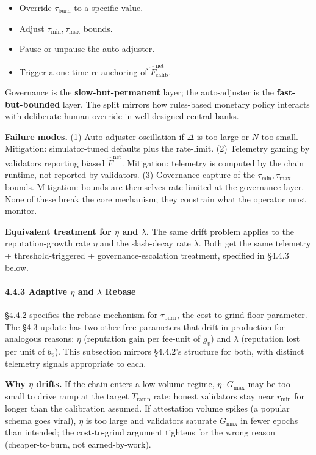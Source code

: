 \documentclass[
  11pt,
]{article}
\providecommand{\tightlist}{%
  \setlength{\itemsep}{0pt}\setlength{\parskip}{0pt}}
\begin{document}
\begin{itemize}
\tightlist
\item
  Override \(\tau_{\text{burn}}\) to a specific value.
\item
  Adjust \(\tau_{\min}, \tau_{\max}\) bounds.
\item
  Pause or unpause the auto-adjuster.
\item
  Trigger a one-time re-anchoring of
  \(\hat{F}^{\text{net}}_{\text{calib}}\).
\end{itemize}

Governance is the \textbf{slow-but-permanent} layer; the auto-adjuster
is the \textbf{fast-but-bounded} layer. The split mirrors how
rules-based monetary policy interacts with deliberate human override in
well-designed central banks.

\textbf{Failure modes.} (1) Auto-adjuster oscillation if \(\Delta\) is
too large or \(N\) too small. Mitigation: simulator-tuned defaults plus
the rate-limit. (2) Telemetry gaming by validators reporting biased
\(\hat{F}^{\text{net}}\). Mitigation: telemetry is computed by the chain
runtime, not reported by validators. (3) Governance capture of the
\(\tau_{\min}, \tau_{\max}\) bounds. Mitigation: bounds are themselves
rate-limited at the governance layer. None of these break the core
mechanism; they constrain what the operator must monitor.

\textbf{Equivalent treatment for $\eta$ and $\lambda$.} The same drift
problem applies to the reputation-growth rate \(\eta\) and the
slash-decay rate \(\lambda\). Both get the same telemetry +
threshold-triggered + governance-escalation treatment, specified in
§4.4.3 below.

\paragraph{\texorpdfstring{4.4.3 Adaptive \(\eta\) and \(\lambda\)
Rebase}{4.4.3 Adaptive \textbackslash eta and \textbackslash lambda Rebase}}\label{adaptive-eta-and-lambda-rebase}

§4.4.2 specifies the rebase mechanism for \(\tau_{\text{burn}}\), the
cost-to-grind floor parameter. The §4.3 update has two other free
parameters that drift in production for analogous reasons: \(\eta\)
(reputation gain per fee-unit of \(g_v\)) and \(\lambda\) (reputation
lost per unit of \(b_v\)). This subsection mirrors §4.4.2's structure
for both, with distinct telemetry signals appropriate to each.

\textbf{Why $\eta$ drifts.} If the chain enters a low-volume regime,
\(\eta \cdot G_{\max}\) may be too small to drive ramp at the target
\(T_{\text{ramp}}\) rate; honest validators stay near \(r_{\min}\) for
longer than the calibration assumed. If attestation volume spikes (a
popular schema goes viral), \(\eta\) is too large and validators
saturate \(G_{\max}\) in fewer epochs than intended; the cost-to-grind
argument tightens for the wrong reason (cheaper-to-burn, not
earned-by-work).
\end{document}
